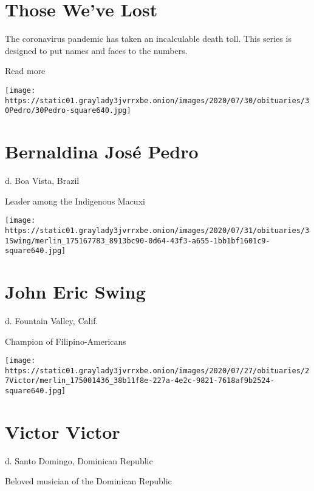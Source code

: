 \href{https://www.nytimes3xbfgragh.onion/interactive/2020/obituaries/people-died-coronavirus-obituaries.html?action=click\&pgtype=Article\&state=default\&region=BELOW_MAIN_CONTENT\&context=covid_obits_promo}{}

\hypertarget{those-weve-lost}{%
\section{Those We've Lost}\label{those-weve-lost}}

The coronavirus pandemic has taken an incalculable death toll. This
series is designed to put names and faces to the numbers.

Read more

\texttt{[image: https://static01.graylady3jvrrxbe.onion/images/2020/07/30/obituaries/30Pedro/30Pedro-square640.jpg]}

\hypertarget{bernaldina-josuxe9-pedro}{%
\section{Bernaldina José Pedro}\label{bernaldina-josuxe9-pedro}}

d. Boa Vista, Brazil

Leader among the Indigenous Macuxi

\texttt{[image: https://static01.graylady3jvrrxbe.onion/images/2020/07/31/obituaries/31Swing/merlin\_175167783\_8913bc90-0d64-43f3-a655-1bb1bf1601c9-square640.jpg]}

\hypertarget{john-eric-swing}{%
\section{John Eric Swing}\label{john-eric-swing}}

d. Fountain Valley, Calif.

Champion of Filipino-Americans

\texttt{[image: https://static01.graylady3jvrrxbe.onion/images/2020/07/27/obituaries/27Victor/merlin\_175001436\_38b11f8e-227a-4e2c-9821-7618af9b2524-square640.jpg]}

\hypertarget{victor-victor}{%
\section{Victor Victor}\label{victor-victor}}

d. Santo Domingo, Dominican Republic

Beloved musician of the Dominican Republic

